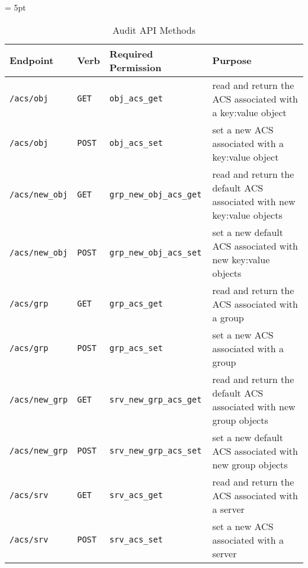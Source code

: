 \begin{table}[!tb]
  \vspace{1ex}
  \begin{center}
    \tabulinesep = 5pt
    \begin{tabu} to \textwidth
      { | X[.7,l,m]
        | X[.3,l,m]
        | X[1,l,m]
        | X[2,l,m]
        | }
      \hline
      \textbf{Endpoint}
      & \textbf{Verb}
      & \textbf{Required Permission}
      & \textbf{Purpose}
      \\ \hline
      \texttt{/acs/obj} & \texttt{GET} & \texttt{obj\_acs\_get}
      & read and return the ACS associated with a key:value object
      \\ \hline
      \texttt{/acs/obj} & \texttt{POST} & \texttt{obj\_acs\_set}
      & set a new ACS associated with a key:value object
      \\ \hline
      \texttt{/acs/new\_obj} & \texttt{GET} & \texttt{grp\_new\_obj\_acs\_get}
      & read and return the default ACS associated with new key:value objects
      \\ \hline
      \texttt{/acs/new\_obj} & \texttt{POST} & \texttt{grp\_new\_obj\_acs\_set}
      & set a new default ACS associated with new key:value objects
      \\ \hline
      \texttt{/acs/grp} & \texttt{GET} & \texttt{grp\_acs\_get}
      & read and return the ACS associated with a group
      \\ \hline
      \texttt{/acs/grp} & \texttt{POST} & \texttt{grp\_acs\_set}
      & set a new ACS associated with a group
      \\ \hline
      \texttt{/acs/new\_grp} & \texttt{GET} & \texttt{srv\_new\_grp\_acs\_get}
      & read and return the default ACS associated with new group objects
      \\ \hline
      \texttt{/acs/new\_grp} & \texttt{POST} & \texttt{srv\_new\_grp\_acs\_set}
      & set a new default ACS associated with new group objects
      \\ \hline
      \texttt{/acs/srv} & \texttt{GET} & \texttt{srv\_acs\_get}
      & read and return the ACS associated with a server
      \\ \hline
      \texttt{/acs/srv} & \texttt{POST} & \texttt{srv\_acs\_set}
      & set a new ACS associated with a server
      \\ \hline
    \end{tabu}
  \end{center}
  \caption{Audit API Methods}
  \label{tab:methods-mgmt}
\end{table}

